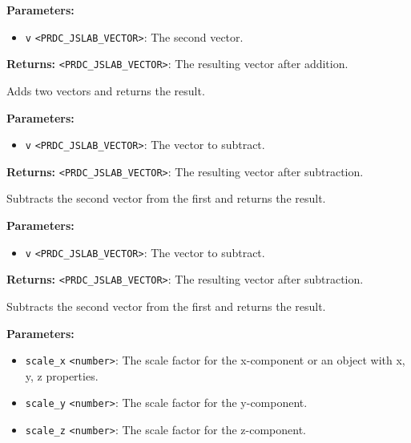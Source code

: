 \documentclass[12pt,a4paper]{article}
\begin{document}
\noindent \textbf{Parameters:}
\begin{itemize}
  \item \texttt{v} \texttt{<PRDC\_JSLAB\_VECTOR>}: The second vector.
\end{itemize}

\noindent \textbf{Returns:} \texttt{<PRDC\_JSLAB\_VECTOR>}: The resulting vector after addition.

\noindent Adds two vectors and returns the result.

\vspace{5mm}
\noindent {}


\noindent \textbf{Parameters:}
\begin{itemize}
  \item \texttt{v} \texttt{<PRDC\_JSLAB\_VECTOR>}: The vector to subtract.
\end{itemize}

\noindent \textbf{Returns:} \texttt{<PRDC\_JSLAB\_VECTOR>}: The resulting vector after subtraction.

\noindent Subtracts the second vector from the first and returns the result.

\vspace{5mm}
\noindent {}


\noindent \textbf{Parameters:}
\begin{itemize}
  \item \texttt{v} \texttt{<PRDC\_JSLAB\_VECTOR>}: The vector to subtract.
\end{itemize}

\noindent \textbf{Returns:} \texttt{<PRDC\_JSLAB\_VECTOR>}: The resulting vector after subtraction.

\noindent Subtracts the second vector from the first and returns the result.

\vspace{5mm}
\noindent {}


\noindent \textbf{Parameters:}
\begin{itemize}
  \item \texttt{scale\_x} \texttt{<number>}: The scale factor for the x-component or an object with x, y, z properties.
  \item \texttt{scale\_y} \texttt{<number>}: The scale factor for the y-component.
  \item \texttt{scale\_z} \texttt{<number>}: The scale factor for the z-component.
\end{itemize}
\end{document}
